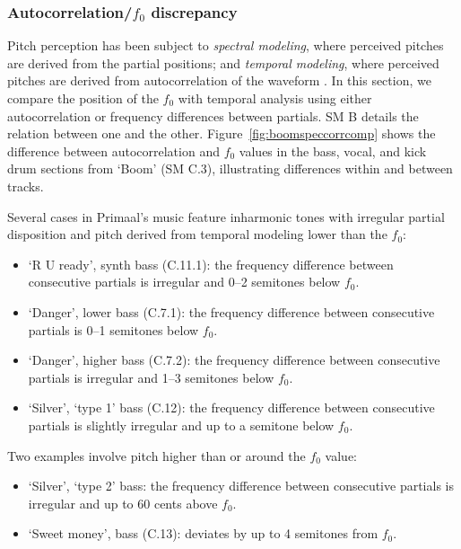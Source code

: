 \documentclass{article}
\begin{document}
\subsubsection{Autocorrelation/$f_0$ discrepancy}\label{sec:autocorrf0discrepancy}


Pitch perception has been subject to \emph{spectral modeling}, where perceived pitches are derived from the partial positions; and \emph{temporal modeling}, where perceived pitches are derived from autocorrelation of the waveform \citep{meddis2006virtual,yost2009pitch}. In this section, we compare the position of the $f_0$ with temporal analysis using either autocorrelation or frequency differences between partials. SM B details the relation between one and the other.
%
Figure~\ref{fig:boomspeccorrcomp} shows the difference between autocorrelation and $f_0$ values in the bass, vocal, and kick drum sections from `Boom' (SM C.3), illustrating differences within and between tracks.

Several cases in Primaal's music feature inharmonic tones with irregular partial disposition and pitch derived from temporal modeling lower than the $f_0$:

\begin{itemize}[noitemsep]
    \item `R U ready', synth bass (C.11.1): the frequency difference between consecutive partials is irregular and 0--2 semitones below $f_0$.
    \item `Danger', lower bass (C.7.1): the frequency difference between consecutive partials is 0--1 semitones below $f_0$.
    \item `Danger', higher bass (C.7.2): the frequency difference between consecutive partials is irregular and 1--3 semitones below $f_0$.
    \item `Silver', `type 1' bass  (C.12): the frequency difference between consecutive partials is slightly irregular and up to a semitone below $f_0$.
\end{itemize}

Two examples involve pitch higher than or around the $f_0$ value:

\begin{itemize}[noitemsep]
    \item `Silver', `type 2' bass: the frequency difference between consecutive partials is irregular and up to 60 cents above $f_0$.
    \item `Sweet money', bass (C.13): deviates by up to 4 semitones from $f_0$.
\end{itemize}
\end{document}
